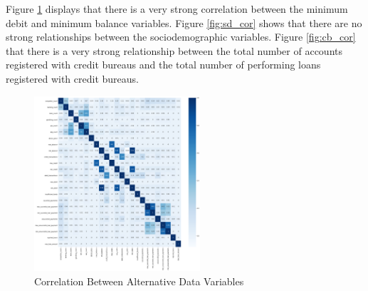 Figure \ref{fig:alt_cor} displays that there is a very strong correlation between the minimum debit and minimum balance variables. Figure \ref{fig:sd_cor} shows that there are no strong relationships between the sociodemographic variables. Figure \ref{fig:cb_cor} that there is a very strong relationship between the total number of accounts registered with credit bureaus and the total number of performing loans registered with credit bureaus. \\

\vspace{10 pt}

\begin{figure}[!htb]
\centering
\includegraphics[width=0.55\textwidth]{images/alt_corr.png}
\caption{Correlation Between Alternative Data Variables}
\label{fig:alt_cor}
\end{figure}

\vspace{10 pt}

